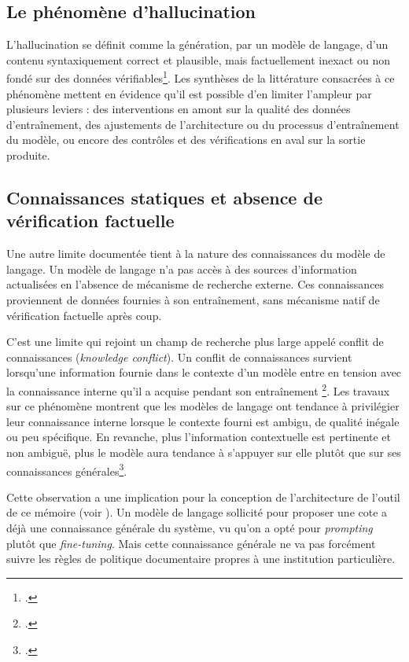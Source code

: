 \subsection{Le phénomène d'hallucination}
\label{sec:limites-hallucination}

L'hallucination se définit comme la génération, par un modèle de langage, d'un contenu syntaxiquement correct et plausible, mais factuellement inexact ou non fondé sur des données vérifiables\footcite{ji2023}. Les synthèses de la littérature consacrées à ce phénomène mettent en évidence qu'il est possible d'en limiter l'ampleur par plusieurs leviers : des interventions en amont sur la qualité des données d'entraînement, des ajustements de l'architecture ou du processus d'entraînement du modèle, ou encore des contrôles et des vérifications en aval sur la sortie produite.


\subsection{Connaissances statiques et absence de vérification factuelle}
\label{sec:limites-connaissances-statiques}

Une autre limite documentée tient à la nature des connaissances du  modèle de langage. Un modèle de langage n'a pas accès à des sources d'information actualisées en l’absence de mécanisme de recherche externe. Ces connaissances proviennent de données fournies à son entraînement, sans mécanisme natif de vérification factuelle après coup. 


C'est une limite qui rejoint un champ de recherche plus large appelé conflit de connaissances (\textit{knowledge conflict}). Un conflit de connaissances survient lorsqu'une information fournie dans le contexte d'un modèle entre en tension avec la connaissance interne qu'il a acquise pendant son entraînement \footcite{xu2024}.  Les travaux sur ce phénomène montrent que les modèles de langage ont tendance à privilégier leur connaissance interne lorsque le contexte fourni est ambigu, de qualité inégale ou peu spécifique. En revanche, plus l’information contextuelle est pertinente et non ambiguë, plus le modèle aura tendance à s’appuyer sur elle plutôt que sur ses connaissances générales\footcite{xu2024}.

Cette observation a une implication pour la conception de l'architecture de l'outil de ce mémoire (voir ). Un modèle de langage sollicité pour proposer une cote a déjà une connaissance générale du système, vu qu'on a opté pour \textit{prompting} plutôt que \textit{fine-tuning}. Mais cette connaissance générale ne va pas forcément suivre les règles de politique documentaire propres à une institution particulière.

